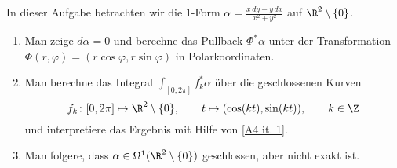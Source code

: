                         \begin{prob}
In dieser Aufgabe betrachten wir die $1$-Form $\alpha = \frac{x\,dy - y\,dx}{x^2+y^2}$ auf $\R^2 \setminus \{0\}$. 

\begin{enumerate}[label = (\alph*)]
	\item Man zeige $d\alpha=0$ und berechne das Pullback $\Phi^*\alpha$ unter
	der Transformation $\Phi(r,\varphi)=(r\cos\varphi,r\sin\varphi)$ in
	Polarkoordinaten. \label{A4 it. 1}
	\item Man berechne das Integral $\int_{[0,2\pi]}f_k^*\alpha$ \"uber die geschlossenen Kurven
	$$
	f_k \colon [0,2\pi] \mapsto \R^2 \setminus \{0\}, \qquad
	t \mapsto (\cos(kt), \sin(kt)), \qquad k \in \Z
	$$
	und interpretiere das Ergebnis mit Hilfe von \ref{A4 it. 1}. 
	\item Man folgere, dass $\alpha \in \Omega^1(\R^2 \setminus \{0\} )$ geschlossen, aber nicht exakt ist. 
\end{enumerate}

\end{prob}
